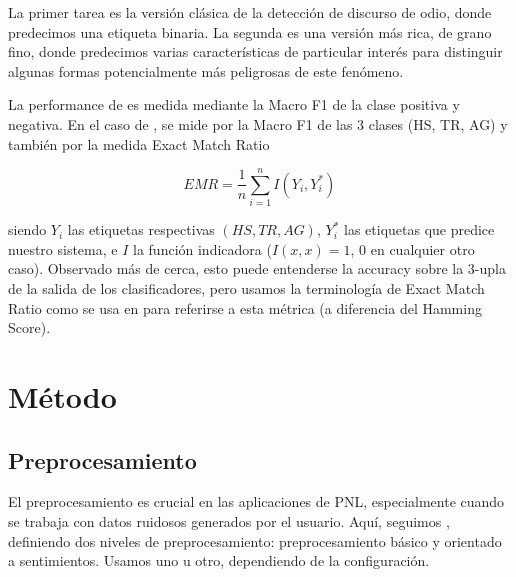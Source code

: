 
La primer tarea es la versión clásica de la detección de discurso de odio, donde predecimos una etiqueta binaria. La segunda es una versión más rica, de grano fino, donde predecimos varias características de particular interés para distinguir algunas formas potencialmente más peligrosas de este fenómeno.

La performance de \subtaska{} es medida mediante la Macro F1 de la clase positiva y negativa. En el caso de \subtaskb{}, se mide por la Macro F1 de las 3 clases (HS, TR, AG) y también por la medida Exact Match Ratio

\begin{equation*}
    EMR = \frac{1}{n} \sum\limits_{i=1}^{n} I(Y_i, Y_i^*)
\end{equation*}

siendo $Y_i$ las etiquetas respectivas $(HS, TR, AG)$, $Y_i^*$ las etiquetas que predice nuestro sistema, e  $I$ la función indicadora ($I(x, x) = 1$, $0$ en cualquier otro caso). Observado más de cerca, esto puede entenderse la accuracy sobre la 3-upla de la salida de los clasificadores, pero usamos la terminología de Exact Match Ratio como se usa en \citet{zhang-2014-multilabel} para referirse a esta métrica (a diferencia del Hamming Score).

\section{Método}

\subsection{Preprocesamiento}
\label{sec:04_preprocessing}

\newcommand{\elmo}[0]{ELMo}
\newcommand{\elmomodel}[0]{\emph{LSTM-\elmo{}}}
\newcommand{\bow}[0]{BoW}
\newcommand{\boc}[0]{BoC}
\newcommand{\elmobowmodel}[0]{\emph{LSTM-\elmo{}+\bow{}}}
\newcommand{\svmmodel}[0]{$\mathrm{SVM}_0$}
\newcommand{\hateval}[0]{HatEval}
\newcommand{\semeval}[0]{SemEval-2019}
\newcommand{\fasttext}[0]{\emph{fastText}}

El preprocesamiento es crucial en las aplicaciones de PNL, especialmente cuando se trabaja con datos ruidosos generados por el usuario. Aquí, seguimos \citet{atalaya_tass2018}, definiendo dos niveles de preprocesamiento: preprocesamiento básico y orientado a sentimientos. Usamos uno u otro, dependiendo de la configuración.

